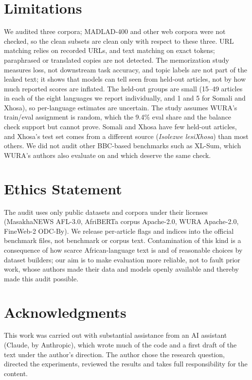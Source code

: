 \documentclass[11pt]{article}
\newcommand{\om}[1]{\textit{#1}}
\begin{document}
\section*{Limitations}
\label{sec:limits}

We audited three corpora; MADLAD-400 and other web corpora were not checked, so the clean subsets are clean only with respect to these three. URL matching relies on recorded URLs, and text matching on exact tokens; paraphrased or translated copies are not detected. The memorization study measures loss, not downstream task accuracy, and topic labels are not part of the leaked text; it shows that models can tell seen from held-out articles, not by how much reported scores are inflated. The held-out groups are small (15--49 articles in each of the eight languages we report individually, and 1 and 5 for Somali and Xhosa), so per-language estimates are uncertain. The study assumes WURA's train/eval assignment is random, which the 9.4\% eval share and the balance check support but cannot prove. Somali and Xhosa have few held-out articles, and Xhosa's test set comes from a different source (\om{Isolezwe lesiXhosa}) than most others. We did not audit other BBC-based benchmarks such as XL-Sum, which WURA's authors also evaluate on and which deserve the same check.

\section*{Ethics Statement}

The audit uses only public datasets and corpora under their licenses (MasakhaNEWS AFL-3.0, AfriBERTa corpus Apache-2.0, WURA Apache-2.0, FineWeb-2 ODC-By). We release per-article flags and indices into the official benchmark files, not benchmark or corpus text. Contamination of this kind is a consequence of how scarce African-language text is and of reasonable choices by dataset builders; our aim is to make evaluation more reliable, not to fault prior work, whose authors made their data and models openly available and thereby made this audit possible.

\section*{Acknowledgments}

This work was carried out with substantial assistance from an AI assistant (Claude, by Anthropic), which wrote much of the code and a first draft of the text under the author's direction. The author chose the research question, directed the experiments, reviewed the results and takes full responsibility for the content.
\end{document}
